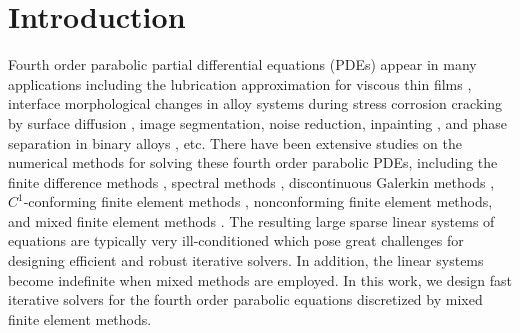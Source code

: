 \documentclass[smallcondensed]{svjour3}
\numberwithin{equation}{section} \numberwithin{table}{section}
\numberwithin{figure}{section}
\numberwithin{algorithm}{section}
\begin{document}
\section{Introduction}
Fourth order parabolic partial differential equations (PDEs) appear in many applications including the lubrication approximation for viscous thin films \cite{king2003fourth},  interface morphological changes in alloy systems during stress corrosion cracking by surface diffusion \cite{asaro1972interface}, image segmentation, noise reduction, inpainting \cite{bertozzi2007inpainting, greer2004h}, and phase separation in binary alloys \cite{blowey1991cahn, elliott1989cahn, cahn2004free}, etc. There have been extensive studies on the numerical methods for solving these fourth order parabolic PDEs, including the finite difference methods \cite{furihata2001stable, sun1995second}, spectral methods \cite{ye2005fourier, he2008stability}, discontinuous Galerkin methods \cite{xia2007local,choo2005discontinuous,feng2007fully}, $C^1$-conforming finite element methods \cite{elliott1987numerical,feng2005numerical},  nonconforming finite element methods\cite{elliott1989nonconforming,zhang2010nonconforming}, and mixed finite element methods \cite{du1991numerical, elliott1989second,elliott1992error,feng2004error,barrett1999finite,BElliot1992Cahn-Hilliard}.   The resulting large sparse linear systems of equations are typically very ill-conditioned which pose great challenges for designing efficient and robust iterative solvers. In addition, the linear systems become indefinite when mixed methods are employed. In this work, we design fast iterative solvers for the fourth order parabolic equations discretized by mixed finite element methods.
\end{document}
